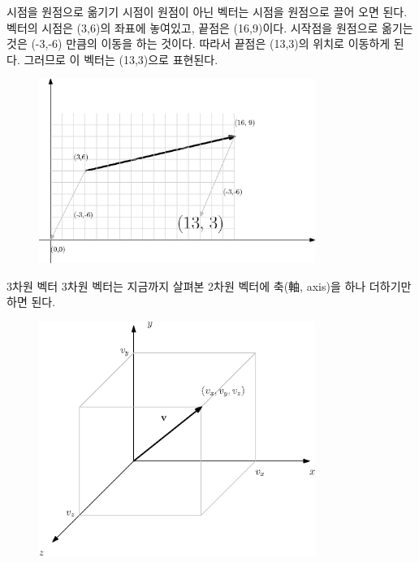 \documentclass{beamer}
\begin{document}
\begin{frame}{시점을 원점으로 옮기기}
시점이 원점이 아닌 벡터는 시점을 원점으로 끌어 오면 된다.
벡터의 시점은 (3,6)의 좌표에 놓여있고, 끝점은 (16,9)이다. 시작점을 원점으로 옮기는 것은 (-3,-6) 만큼의 이동을 하는 것이다.
따라서 끝점은 (13,3)의 위치로 이동하게 된다. 그러므로 이 벡터는 (13,3)으로 표현된다.

\begin{figure}
\includegraphics[width=9cm]{Math_vector/vectorMove.eps}
\end{figure}

\end{frame}

\begin{frame}{3차원 벡터}
3차원 벡터는 지금까지 살펴본 2차원 벡터에 축(軸, axis)을 하나 더하기만 하면 된다.
\begin{figure}
\includegraphics[width=9cm]{Math_vector/3dVector.eps}
\end{figure}
\end{frame}
\end{document}
